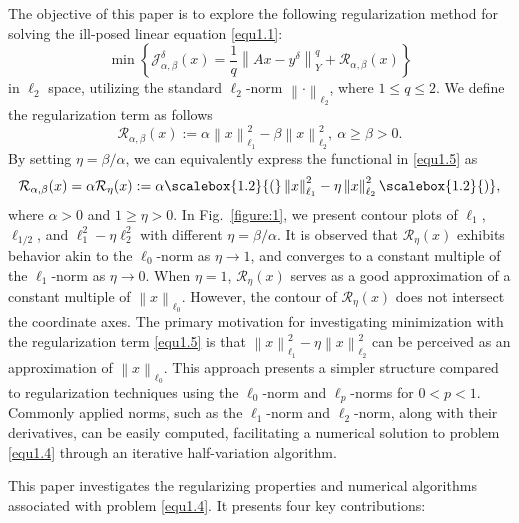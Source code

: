 \documentclass[a4paper,12pt]{article}
\numberwithin{equation}{section}
\begin{document}
\par The objective of this paper is to explore the following regularization method for solving the ill-posed linear equation \eqref{equ1.1}:
\begin{equation}\label{equ1.4}
    \min\left\{\mathcal{J}_{\alpha,\beta}^{\delta}(x)= \frac{1}{q}\left\|Ax-y^{\delta}\right\|_{Y}^{q}+\mathcal{R}_{\alpha,\beta}(x)\right\}
\end{equation}
in $\ell_{2}$ space, utilizing the standard $\ell_{2}$-norm $\left\|\cdot\right\|_{\ell_{2}}$, where $1\leq q\leq 2$. We define the regularization term as follows
\begin{equation}\label{equ1.5}
    \mathcal{R}_{\alpha,\beta}\left(x\right):=\alpha\left\|x\right\|_{\ell_{1}}^{2}-\beta\left\|x\right\|_{\ell_{2}}^{2},\ \alpha\geq\beta >0.
\end{equation}
By setting $\eta=\beta/\alpha$, we can equivalently express the functional in \eqref{equ1.5} as
\begin{equation*}
    \mathcal{R}_{\alpha,\beta}(x)=\alpha\mathcal{R}_{\eta}(x):= \alpha\scalebox{1.2}{(} \left\|x\right\|_{\ell_{1}}^{2}-\eta\left\|x\right\|_{\ell_{2}}^{2}\scalebox{1.2}{)},
\end{equation*}
where $\alpha>0$ and $1\geq\eta> 0$. In Fig.\ \ref{figure:1}, we present contour plots of $\ell_{1}$, $\ell_{1/2}$, and $\ell_{1}^{2}-\eta\ell_{2}^{2}$ with different $\eta=\beta/\alpha$. It is observed that $\mathcal{R}_{\eta}\left(x\right)$ exhibits behavior akin to the $\ell_{0}$-norm as $\eta\rightarrow 1$, and converges to a constant multiple of the $\ell_{1}$-norm as $\eta\rightarrow 0$. When $\eta=1$, $\mathcal{R}_{\eta}\left(x\right)$ serves as a good approximation of a constant multiple of $\left\|x\right\|_{\ell_{0}}$. However, the contour of $\mathcal{R}_{\eta}\left(x\right)$ does not intersect the coordinate axes. The primary motivation for investigating minimization with the regularization term \eqref{equ1.5} is that $\left\|x\right\|_{\ell_{1}}^{2}-\eta\left\|x\right\|_{\ell_{2}}^{2}$ can be perceived as an approximation of $\left\|x\right\|_{\ell_{0}}$. This approach presents a simpler structure compared to regularization techniques using the $\ell_{0}$-norm and $\ell_{p}$-norms for $0<p <1$. Commonly applied norms, such as the $\ell_{1}$-norm and $\ell_{2}$-norm, along with their derivatives, can be easily computed, facilitating a numerical solution to problem \eqref{equ1.4} through an iterative half-variation algorithm.

\par This paper investigates the regularizing properties and numerical algorithms associated with problem \eqref{equ1.4}. It presents four key contributions:
\end{document}
